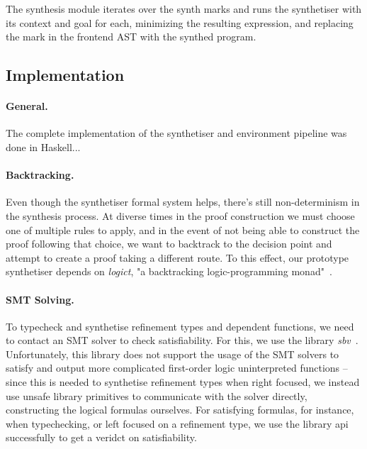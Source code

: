 \documentclass{llncs}
\newcommand{\mypara}[1]{\paragraph{\textbf{#1}.}}
\begin{document}
The synthesis module iterates over the synth marks and runs the synthetiser with
its context and goal for each, minimizing the resulting expression, and
replacing the mark in the frontend AST with the synthed program.


\subsection{Implementation}

\mypara{General} The complete implementation of the synthetiser and environment
pipeline was done in Haskell...

\mypara{Backtracking} Even though the synthetiser formal system helps, there's
still non-determinism in the synthesis process. At diverse times in the proof
construction we must choose one of multiple rules to apply, and in the event of
not being able to construct the proof following that choice, we want to
backtrack to the decision point and attempt to create a proof taking a different
route. To this effect, our prototype synthetiser depends on \emph{logict}, "a backtracking logic-programming
monad"~\cite{logict}.

\mypara{SMT Solving} To typecheck and synthetise refinement types and dependent
functions, we need to contact an SMT solver to check satisfiability. For this,
we use the library \emph{sbv}~\cite{sbv}. Unfortunately, this library does not
support the usage of the SMT solvers to satisfy and output more complicated
first-order logic uninterpreted functions -- since this is needed to synthetise refinement types
when right focused, we instead use unsafe library primitives to communicate with
the solver directly, constructing the logical formulas ourselves. For 
satisfying formulas, for instance, when typechecking, or left focused on a
refinement type, we use the library api successfully to get a veridct on
satisfiability.
\end{document}
